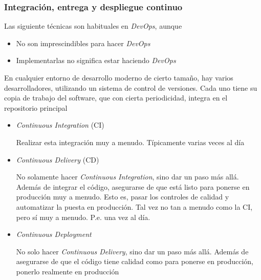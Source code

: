 \documentclass[ucs]{beamer}
\begin{document}
\begin{frame}[fragile]
\frametitle{Integración, entrega y despliegue continuo}

Las siguiente técnicas son habituales en 
\emph{DevOps},
aunque

\begin{itemize}
\item
No son imprescindibles para hacer 
\emph{DevOps}
\item
Implementarlas no significa estar haciendo
\emph{DevOps}
\end{itemize}

En cualquier entorno de desarrollo moderno de cierto tamaño, hay varios desarrolladores,
utilizando un sistema de control de versiones. Cada uno tiene su copia de trabajo del software,
que con cierta periodicidad, integra en el repositorio principal

\begin{itemize}
\item
\emph{Continuous Integration} (CI) 

Realizar esta integración muy a menudo. Típicamente
varias veces al día

\end{itemize}
\end{frame}
\begin{frame}[fragile]
\begin{itemize}
\item
\emph{Continuous Delivery} (CD) 

No solamente hacer
\emph{Continuous Integration}, sino dar un paso más allá. Además de integrar el código, asegurarse
de que está listo para ponerse en producción muy a menudo. Esto es, pasar los controles de calidad
y automatizar la puesta en producción. Tal vez no tan a menudo como la CI, pero sí
muy a menudo. P.e. una vez al día.

\item
\emph{Continuous Deployment} 

No solo hacer 
\emph{Continuous Delivery}, sino dar un paso más allá. Además de asegurarse de que el código tiene
calidad como para ponerse en producción, ponerlo realmente en producción
\end{itemize}
\end{frame}
\end{document}
